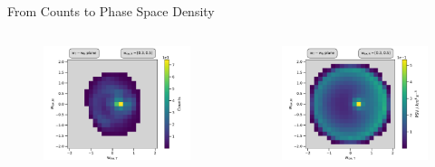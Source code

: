 \documentclass{beamer}
\begin{document}
\begin{frame}{From Counts to Phase Space Density}
\begin{columns}
	\column[]{5cm}
	\begin{figure}
		\includegraphics[scale=.35]{Pics/cart_50_counts_R.pdf}
	\end{figure}
	\column[]{5cm}
	\begin{figure}
		\includegraphics[scale=.35]{Pics/cart_50_norm_R.pdf}
	\end{figure}
\column[]{1cm}
	\end{columns}

\end{frame}

\end{document}
